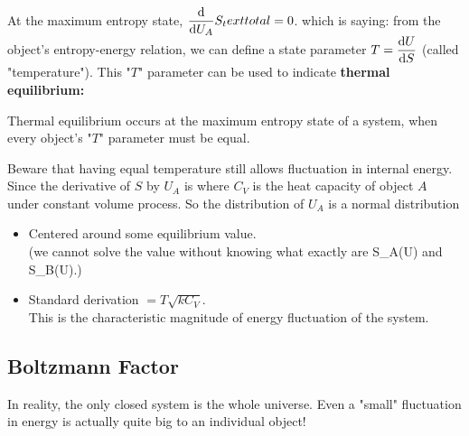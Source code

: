 \documentclass[class=article, crop=false, 12pt]{standalone}
\begin{document}
At the maximum entropy state, $\dvv{U_A}S_text{total} = 0$.
which is saying: from the object's entropy-energy relation,
we can define a state parameter $T=\dvv{U}{S}$ (called "temperature").
This "$T$" parameter can be used to indicate \bf{thermal equilibrium}: 
\begin{minipage}{0.8\textwidth}
    \begin{center}
        \begin{framed}
            \centering
            Thermal equilibrium occurs at the maximum entropy state of a system, 
            when every object's "$T$" parameter must be equal.
        \end{framed}
    \end{center}
\end{minipage}

Beware that having equal temperature still allows fluctuation in internal energy.
Since the  derivative of $S$ by $U_A$ is 
where $C_V$ is the heat capacity of object $A$ under constant volume process.
So the distribution of $U_A$ is a normal distribution 
\begin{itemize}
    \item Centered around some equilibrium value.\\
    (we cannot solve the value without knowing what exactly are S_A(U) and S_B(U).)

    \item Standard derivation $= T\sqrt{kC_V}$.\\
    This is the characteristic magnitude of energy fluctuation of the system.  
\end{itemize}


\subsection{Boltzmann Factor}

In reality, the only closed system is the whole universe.
Even a "small" fluctuation in energy is actually quite big to an individual object!
\end{document}
